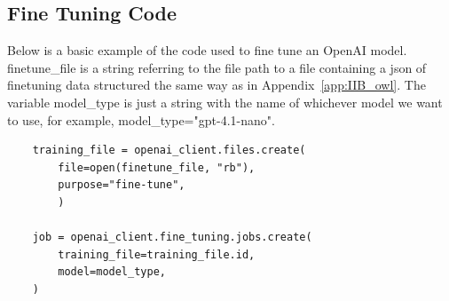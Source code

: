 \documentclass[conference]{IEEEtran}
\begin{document}
\subsection{Fine Tuning Code}
\label{app:ft_code}
Below is a basic example of the code used to fine tune an OpenAI model. finetune\_file is a string referring to the file path to a file containing a json of finetuning data structured the same way as in Appendix~\ref{app:IIB_owl}. The variable model\_type is just a string with the name of whichever model we want to use, for example, model\_type="gpt-4.1-nano".
    \begin{lstlisting}
    training_file = openai_client.files.create(
        file=open(finetune_file, "rb"),
        purpose="fine-tune",
        )
            
    job = openai_client.fine_tuning.jobs.create(
        training_file=training_file.id,
        model=model_type,
    )
    \end{lstlisting}
\end{document}
